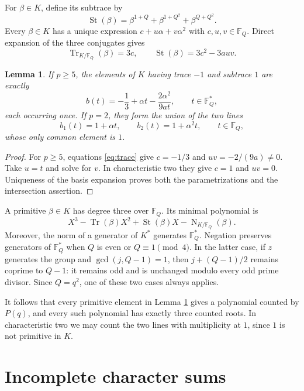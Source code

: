 \documentclass[11pt]{article}
\newtheorem{lemma}[theorem]{Lemma}
\theoremstyle{remark}\newtheorem{remark}[theorem]{Remark}
\newcommand{\F}{\mathbb F}
\newcommand{\Tr}{\operatorname{Tr}}
\newcommand{\Nm}{\operatorname{N}}
\begin{document}
For $\beta\in K$, define its subtrace by
\[
 \operatorname{St}(\beta)=\beta^{1+Q}+\beta^{1+Q^2}+\beta^{Q+Q^2}.
\]
Every $\beta\in K$ has a unique expression $c+u\alpha+v\alpha^2$ with $c,u,v\in\F_Q$. Direct expansion of the three conjugates gives
\begin{equation}\label{eq:trace}
 \Tr_{K/\F_Q}(\beta)=3c,\qquad
 \operatorname{St}(\beta)=3c^2-3auv.
\end{equation}

\begin{lemma}\label{lem:param}
If $p\ge5$, the elements of $K$ having trace $-1$ and subtrace $1$ are exactly
\begin{equation}\label{eq:oddparam}
 b(t)=-\frac13+\alpha t-\frac{2\alpha^2}{9at},\qquad t\in\F_Q^*,
\end{equation}
each occurring once. If $p=2$, they form the union of the two lines
\begin{equation}\label{eq:evenparam}
 b_1(t)=1+\alpha t,\qquad b_2(t)=1+\alpha^2t,
 \qquad t\in\F_Q,
\end{equation}
whose only common element is $1$.
\end{lemma}
\begin{proof}
For $p\ge5$, equations \eqref{eq:trace} give $c=-1/3$ and $uv=-2/(9a)\ne0$. Take $u=t$ and solve for $v$. In characteristic two they give $c=1$ and $uv=0$. Uniqueness of the basis expansion proves both the parametrizations and the intersection assertion.
\end{proof}

A primitive $\beta\in K$ has degree three over $\F_Q$. Its minimal polynomial is
\[
 X^3-\Tr(\beta)X^2+\operatorname{St}(\beta)X-\Nm_{K/\F_Q}(\beta).
\]
Moreover, the norm of a generator of $K^*$ generates $\F_Q^*$. Negation preserves generators of $\F_Q^*$ when $Q$ is even or $Q\equiv1\pmod4$. In the latter case, if $z$ generates the group and $\gcd(j,Q-1)=1$, then $j+(Q-1)/2$ remains coprime to $Q-1$: it remains odd and is unchanged modulo every odd prime divisor. Since $Q=q^2$, one of these two cases always applies.

It follows that every primitive element in Lemma \ref{lem:param} gives a polynomial counted by $P(q)$, and every such polynomial has exactly three counted roots. In characteristic two we may count the two lines with multiplicity at $1$, since $1$ is not primitive in $K$.

\section{Incomplete character sums}
\end{document}
